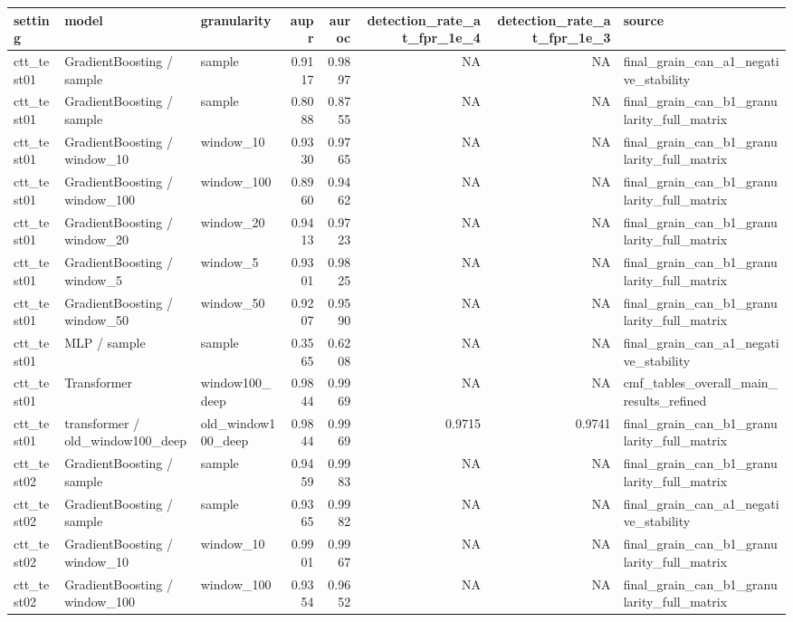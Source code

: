 \begin{tabular}{lllrrrrl}
\toprule
setting & model & granularity & aupr & auroc & detection\_rate\_at\_fpr\_1e\_4 & detection\_rate\_at\_fpr\_1e\_3 & source \\
\midrule
ctt\_test01 & GradientBoosting / sample & sample & 0.9117 & 0.9897 & NA & NA & final\_grain\_can\_a1\_negative\_stability \\
ctt\_test01 & GradientBoosting / sample & sample & 0.8088 & 0.8755 & NA & NA & final\_grain\_can\_b1\_granularity\_full\_matrix \\
ctt\_test01 & GradientBoosting / window\_10 & window\_10 & 0.9330 & 0.9765 & NA & NA & final\_grain\_can\_b1\_granularity\_full\_matrix \\
ctt\_test01 & GradientBoosting / window\_100 & window\_100 & 0.8960 & 0.9462 & NA & NA & final\_grain\_can\_b1\_granularity\_full\_matrix \\
ctt\_test01 & GradientBoosting / window\_20 & window\_20 & 0.9413 & 0.9723 & NA & NA & final\_grain\_can\_b1\_granularity\_full\_matrix \\
ctt\_test01 & GradientBoosting / window\_5 & window\_5 & 0.9301 & 0.9825 & NA & NA & final\_grain\_can\_b1\_granularity\_full\_matrix \\
ctt\_test01 & GradientBoosting / window\_50 & window\_50 & 0.9207 & 0.9590 & NA & NA & final\_grain\_can\_b1\_granularity\_full\_matrix \\
ctt\_test01 & MLP / sample & sample & 0.3565 & 0.6208 & NA & NA & final\_grain\_can\_a1\_negative\_stability \\
ctt\_test01 & Transformer & window100\_deep & 0.9844 & 0.9969 & NA & NA & cmf\_tables\_overall\_main\_results\_refined \\
ctt\_test01 & transformer / old\_window100\_deep & old\_window100\_deep & 0.9844 & 0.9969 & 0.9715 & 0.9741 & final\_grain\_can\_b1\_granularity\_full\_matrix \\
ctt\_test02 & GradientBoosting / sample & sample & 0.9459 & 0.9983 & NA & NA & final\_grain\_can\_b1\_granularity\_full\_matrix \\
ctt\_test02 & GradientBoosting / sample & sample & 0.9365 & 0.9982 & NA & NA & final\_grain\_can\_a1\_negative\_stability \\
ctt\_test02 & GradientBoosting / window\_10 & window\_10 & 0.9901 & 0.9967 & NA & NA & final\_grain\_can\_b1\_granularity\_full\_matrix \\
ctt\_test02 & GradientBoosting / window\_100 & window\_100 & 0.9354 & 0.9652 & NA & NA & final\_grain\_can\_b1\_granularity\_full\_matrix \\

\end{tabular}
